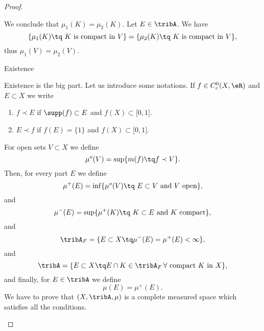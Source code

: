 \begin{proof}
\begin{subproof}
    We conclude that \( \mu_1(K)=\mu_2(K)\).
\spitem[Unicity]
    Let \( E\in\tribA\). We have
    \begin{equation}
        \{ \mu_1(K)\tq \text{ \( K\) is compact in \( V\)} \} = \{ \mu_2(K)\tq \text{ \( K\) is compact in \( V\)} \},
    \end{equation}
    thus \( \mu_1(V)=\mu_2(V)\).
    \end{subproof}
    \begin{center}
        Existence
    \end{center}
    Existence is the big part. Let us introduce some notations. If \( f\in C^0_c(X,\eR)\) and \( E\subset X\) we write
    \begin{enumerate}
        \item \( f\prec E\) if \( \supp(f)\subset E\) and \( f(X)\subset \mathopen[ 0 , 1 \mathclose]\).
        \item \( E\prec f\) if \( f(E)=\{ 1 \}\) and \( f(X)\subset \mathopen[ 0 , 1 \mathclose]\).
    \end{enumerate}
    For open sets \( V\subset X\) we define
    \begin{equation}
        \mu^o(V)=\sup\{ m(f)\tq f\prec V \}.
    \end{equation}
    Then, for every part \( E\) we define
    \begin{equation}
        \mu^+(E)=\inf\{ \mu^o(V)\tq \text{ \( E\subset V\) and \( V\) open} \},
    \end{equation}
    and
    \begin{equation}        \label{EQooSIKUooJeeIqI}
        \mu^-(E)=\sup\{ \mu^+(K)\tq \text{ \( K\subset E\) and \( K\) compact} \},
    \end{equation}
    and
    \begin{equation}
        \tribA_F=\{ E\subset X\tq \mu^-(E)=\mu^+(E)<\infty \},
    \end{equation}
    and
    \begin{equation}
        \tribA=\{ E\subset X\tq E\cap K\in \tribA_F\,\text{\( \forall\) compact \( K\) in \( X\)} \},
    \end{equation}
    and finally, for \( E\in \tribA\) we define
    \begin{equation}
        \mu(E)=\mu^+(E).
    \end{equation}
    We have to prove that \( (X,\tribA,\mu)\) is a complete measured space which satisfies all the conditions.
    \begin{subproof}
    \spitem[\( \mu^o\) is increasing]     \label{ITEMooOMDSooQiYmaP}

\end{subproof}
\end{proof}
